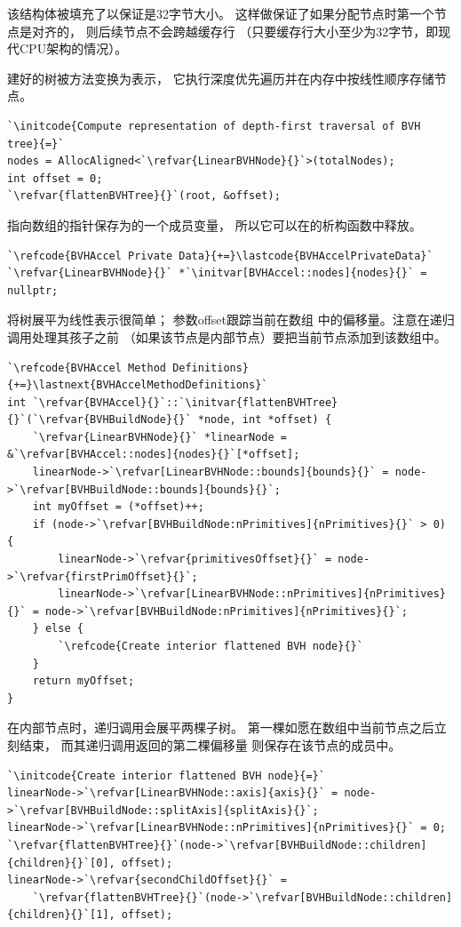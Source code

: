 该结构体被填充了以保证是32字节大小。
这样做保证了如果分配节点时第一个节点是对齐的，
则后续节点不会跨越缓存行
（只要缓存行大小至少为32字节，即现代CPU架构的情况）。

建好的树被方法变换为表示，
它执行深度优先遍历并在内存中按线性顺序存储节点。
\begin{lstlisting}
`\initcode{Compute representation of depth-first traversal of BVH tree}{=}`
nodes = AllocAligned<`\refvar{LinearBVHNode}{}`>(totalNodes);
int offset = 0;
`\refvar{flattenBVHTree}{}`(root, &offset);
\end{lstlisting}

指向数组的指针保存为的一个成员变量，
所以它可以在的析构函数中释放。
\begin{lstlisting}
`\refcode{BVHAccel Private Data}{+=}\lastcode{BVHAccelPrivateData}`
`\refvar{LinearBVHNode}{}` *`\initvar[BVHAccel::nodes]{nodes}{}` = nullptr;
\end{lstlisting}

将树展平为线性表示很简单；
参数{\ttfamily *offset}跟踪当前在数组
中的偏移量。注意在递归调用处理其孩子之前
（如果该节点是内部节点）要把当前节点添加到该数组中。
\begin{lstlisting}
`\refcode{BVHAccel Method Definitions}{+=}\lastnext{BVHAccelMethodDefinitions}`
int `\refvar{BVHAccel}{}`::`\initvar{flattenBVHTree}{}`(`\refvar{BVHBuildNode}{}` *node, int *offset) {
    `\refvar{LinearBVHNode}{}` *linearNode = &`\refvar[BVHAccel::nodes]{nodes}{}`[*offset];
    linearNode->`\refvar[LinearBVHNode::bounds]{bounds}{}` = node->`\refvar[BVHBuildNode::bounds]{bounds}{}`;
    int myOffset = (*offset)++;
    if (node->`\refvar[BVHBuildNode:nPrimitives]{nPrimitives}{}` > 0) {
        linearNode->`\refvar{primitivesOffset}{}` = node->`\refvar{firstPrimOffset}{}`;
        linearNode->`\refvar[LinearBVHNode::nPrimitives]{nPrimitives}{}` = node->`\refvar[BVHBuildNode:nPrimitives]{nPrimitives}{}`;
    } else {
        `\refcode{Create interior flattened BVH node}{}`
    }
    return myOffset;
}
\end{lstlisting}

在内部节点时，递归调用会展平两棵子树。
第一棵如愿在数组中当前节点之后立刻结束，
而其递归调用返回的第二棵偏移量
则保存在该节点的成员中。
\begin{lstlisting}
`\initcode{Create interior flattened BVH node}{=}`
linearNode->`\refvar[LinearBVHNode::axis]{axis}{}` = node->`\refvar[BVHBuildNode::splitAxis]{splitAxis}{}`;
linearNode->`\refvar[LinearBVHNode::nPrimitives]{nPrimitives}{}` = 0;
`\refvar{flattenBVHTree}{}`(node->`\refvar[BVHBuildNode::children]{children}{}`[0], offset);
linearNode->`\refvar{secondChildOffset}{}` =
    `\refvar{flattenBVHTree}{}`(node->`\refvar[BVHBuildNode::children]{children}{}`[1], offset);
\end{lstlisting}

